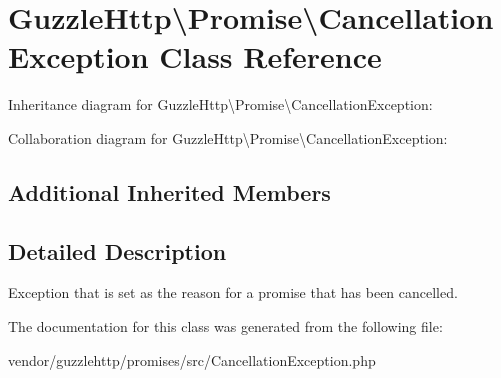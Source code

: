\hypertarget{classGuzzleHttp_1_1Promise_1_1CancellationException}{}\section{Guzzle\+Http\textbackslash{}Promise\textbackslash{}Cancellation\+Exception Class Reference}
\label{classGuzzleHttp_1_1Promise_1_1CancellationException}


Inheritance diagram for Guzzle\+Http\textbackslash{}Promise\textbackslash{}Cancellation\+Exception\+:


Collaboration diagram for Guzzle\+Http\textbackslash{}Promise\textbackslash{}Cancellation\+Exception\+:
\subsection*{Additional Inherited Members}


\subsection{Detailed Description}
Exception that is set as the reason for a promise that has been cancelled. 

The documentation for this class was generated from the following file\+:\begin{DoxyCompactItemize}
\item 
vendor/guzzlehttp/promises/src/Cancellation\+Exception.\+php\end{DoxyCompactItemize}
